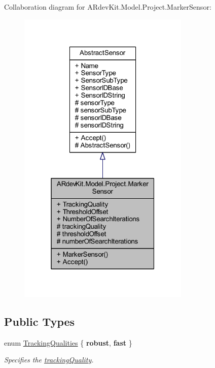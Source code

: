 Collaboration diagram for A\-Rdev\-Kit.\-Model.\-Project.\-Marker\-Sensor\-:
\nopagebreak
\begin{figure}[H]
\begin{center}
\leavevmode
\includegraphics[width=232pt]{class_a_rdev_kit_1_1_model_1_1_project_1_1_marker_sensor__coll__graph}
\end{center}
\end{figure}
\subsection*{Public Types}
\begin{DoxyCompactItemize}
\item 
enum \hyperlink{class_a_rdev_kit_1_1_model_1_1_project_1_1_marker_sensor_adf403b5a2cee12e9f0006bd431cf569f}{Tracking\-Qualities} \{ {\bfseries robust}, 
{\bfseries fast}
 \}
\begin{DoxyCompactList}\small\item\em Specifies the \hyperlink{class_a_rdev_kit_1_1_model_1_1_project_1_1_marker_sensor_af392037ccf5a8cf5e95ce42b0c768483}{tracking\-Quality}. \end{DoxyCompactList}\end{DoxyCompactItemize}
